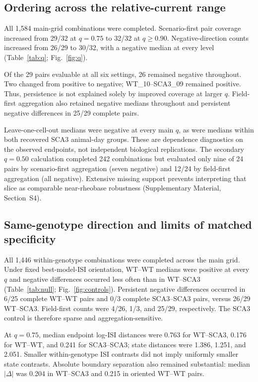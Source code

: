 \documentclass[utf8]{FrontiersinHarvard}
\newcommand{\sref}[1]{Supplementary Material, Section~#1}
\begin{document}
\subsection{Ordering across the relative-current range}\label{sec:qresults}
All 1,584 main-grid combinations were completed. Scenario-first pair coverage increased from 29/32 at $q=0.75$ to 32/32 at $q\geq0.90$. Negative-direction counts increased from 26/29 to 30/32, with a negative median at every level (Table~\ref{tab:q}; Fig.~\ref{fig:q}).

Of the 29 pairs evaluable at all six settings, 26 remained negative throughout. Two changed from positive to negative; WT\_10--SCA3\_09 remained positive. Thus, persistence is not explained solely by improved coverage at larger $q$. Field-first aggregation also retained negative medians throughout and persistent negative differences in 25/29 complete pairs.

Leave-one-cell-out medians were negative at every main $q$, as were medians within both recovered SCA3 animal-day groups. These are dependence diagnostics on the observed endpoints, not independent biological replications. The secondary $q=0.50$ calculation completed 242 combinations but evaluated only nine of 24 pairs by scenario-first aggregation (seven negative) and 12/24 by field-first aggregation (all negative). Extensive missing support prevents interpreting that slice as comparable near-rheobase robustness (\sref{S4}).



\subsection{Same-genotype direction and limits of matched specificity}\label{sec:nullresults}
All 1,446 within-genotype combinations were completed across the main grid. Under fixed best-model-ISI orientation, WT--WT medians were positive at every $q$ and negative differences occurred less often than in WT--SCA3 (Table~\ref{tab:null}; Fig.~\ref{fig:controls}). Persistent negative differences occurred in 6/25 complete WT--WT pairs and 0/3 complete SCA3--SCA3 pairs, versus 26/29 WT--SCA3. Field-first counts were 4/26, 1/3, and 25/29, respectively. The SCA3 control is therefore sparse and aggregation-sensitive.

At $q=0.75$, median endpoint log-ISI distances were 0.763 for WT--SCA3, 0.176 for WT--WT, and 0.241 for SCA3--SCA3; state distances were 1.386, 1.251, and 2.051. Smaller within-genotype ISI contrasts did not imply uniformly smaller state contrasts. Absolute boundary separation also remained substantial: median $|\Delta|$ was 0.204 in WT--SCA3 and 0.215 in oriented WT--WT pairs.
\end{document}
